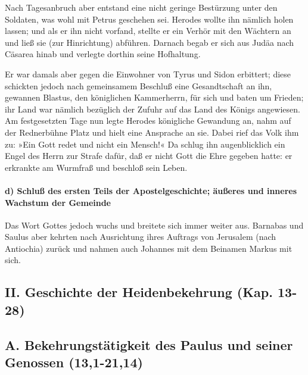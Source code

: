  Nach Tagesanbruch aber entstand eine nicht geringe
Bestürzung unter den Soldaten, was wohl mit Petrus geschehen sei.
 Herodes wollte ihn nämlich holen lassen; und als er ihn
nicht vorfand, stellte er ein Verhör mit den Wächtern an und ließ sie
(zur Hinrichtung) abführen. Darnach begab er sich aus Judäa nach Cäsarea
hinab und verlegte dorthin seine Hofhaltung.

 Er war damals aber gegen die Einwohner von Tyrus und
Sidon erbittert; diese schickten jedoch nach gemeinsamem Beschluß eine
Gesandtschaft an ihn, gewannen Blastus, den königlichen Kammerherrn, für
sich und baten um Frieden; ihr Land war nämlich bezüglich der Zufuhr auf
das Land des Königs angewiesen.  Am festgesetzten Tage
nun legte Herodes königliche Gewandung an, nahm auf der Rednerbühne
Platz und hielt eine Ansprache an sie.  Dabei rief das
Volk ihm zu: »Ein Gott redet und nicht ein Mensch!«  Da
schlug ihn augenblicklich ein Engel des Herrn zur Strafe dafür, daß er
nicht Gott die Ehre gegeben hatte: er erkrankte am Wurmfraß und beschloß
sein Leben.

\hypertarget{d-schluuxdf-des-ersten-teils-der-apostelgeschichte-uxe4uuxdferes-und-inneres-wachstum-der-gemeinde}{%
\paragraph{d) Schluß des ersten Teils der Apostelgeschichte; äußeres und
inneres Wachstum der
Gemeinde}\label{d-schluuxdf-des-ersten-teils-der-apostelgeschichte-uxe4uuxdferes-und-inneres-wachstum-der-gemeinde}}

 Das Wort Gottes jedoch wuchs und breitete sich immer
weiter aus.  Barnabas und Saulus aber kehrten nach
Ausrichtung ihres Auftrags von Jerusalem (nach Antiochia) zurück und
nahmen auch Johannes mit dem Beinamen Markus mit sich.

\hypertarget{ii.-geschichte-der-heidenbekehrung-kap.-13-28}{%
\subsection{II. Geschichte der Heidenbekehrung (Kap.
13-28)}\label{ii.-geschichte-der-heidenbekehrung-kap.-13-28}}

\hypertarget{a.-bekehrungstuxe4tigkeit-des-paulus-und-seiner-genossen-131-2114}{%
\subsection{A. Bekehrungstätigkeit des Paulus und seiner Genossen
(13,1-21,14)}\label{a.-bekehrungstuxe4tigkeit-des-paulus-und-seiner-genossen-131-2114}}

